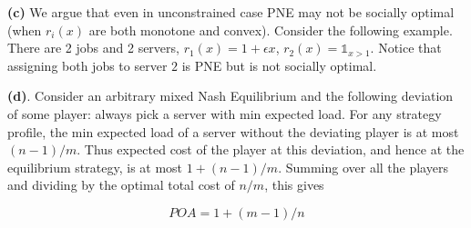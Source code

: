 \textbf{(c)} We argue that even in unconstrained case PNE may not be socially optimal (when $r_i(x)$ are both monotone and convex). Consider the following example. There are 2 jobs and 2 servers, $r_1(x)=1+\epsilon x$, $r_2(x) = \mathbb{1}_{x>1}$. Notice that assigning both jobs to server $2$ is PNE but is not socially optimal. 

\textbf{(d)}. Consider an arbitrary mixed Nash Equilibrium and the following deviation of some player: always pick a server with min expected load. For any strategy profile, the min expected load of a server without the deviating player is at most $(n-1)/m$. Thus expected cost of the player at this deviation, and hence at the equilibrium strategy, is at most $1+(n-1)/m$. Summing over all the players and dividing by the optimal total cost of $n/m$, this gives

$$POA = 1+(m-1)/n$$